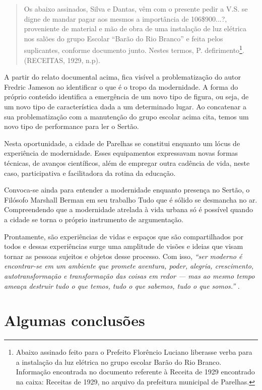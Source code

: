 \begin{refsection}
\begin{quotation}
    Os abaixo assinados, Silva e Dantas, vêm com o presente pedir a V.S. se digne de mandar pagar aos mesmos a importância de 106\$900...?, proveniente de material e mão de obra de uma instalação de luz elétrica nos salões do grupo Escolar ``Barão do Rio Branco'' e feita pelos suplicantes, conforme documento junto. Nestes termos, P. defirimento\footnote{Abaixo assinado feito para o Prefeito Florêncio Luciano liberasse verba para a instalação da luz elétrica no grupo escolar Barão do Rio Branco. Informação encontrada no documento referente à Receita de 1929 encontrado na caixa: Receitas de 1929, no arquivo da prefeitura municipal de Parelhas.}. (RECEITAS, 1929, n.p).
\end{quotation}

A partir do relato documental acima, fica visível a problematização do autor Fredric Jameson ao identificar o que é o tropo da modernidade. A forma do próprio conteúdo identifica a emergência de um novo tipo de figura, ou seja, de um novo tipo de característica dada a um determinado lugar. Ao concatenar a sua problematização com a manutenção do grupo escolar acima cita, temos um novo tipo de performance para ler o Sertão.  

Nesta oportunidade, a cidade de Parelhas se constitui enquanto um lócus de experiência de modernidade. Esses equipamentos expressavam novas formas técnicas, de avanços científicos, além de empregar outra cadência de vida, neste caso, participativa e facilitadora da rotina da educação.  

Convoca-se ainda para entender a modernidade enquanto presença no Sertão, o Filósofo Marshall Berman em seu trabalho Tudo que é sólido se desmancha no ar. Compreendendo que a modernidade atrelada à vida urbana só é possível quando a cidade se torna o próprio instrumento de argumentação.  

Prontamente, são experiências de vidas e espaços que são compartilhados por todos e dessas experiências surge uma amplitude de visões e ideias que visam tornar as pessoas sujeitos e objetos desse processo. Com isso, \textit{``ser moderno é encontrar-se em um ambiente que promete aventura, poder, alegria, crescimento, autotransformação e transformação das coisas em redor --- mas ao mesmo tempo ameaça destruir tudo o que temos, tudo o que sabemos, tudo o que somos.''} \cite[p.~15]{Berman1986Tudo}.

\section{Algumas conclusões}


\end{refsection}
